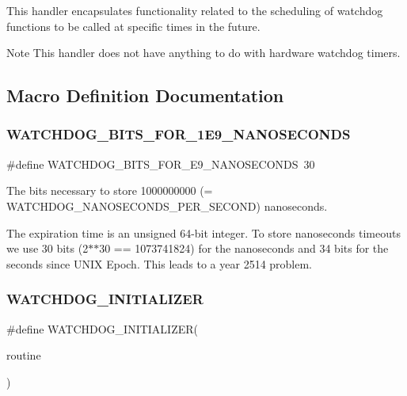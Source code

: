 This handler encapsulates functionality related to the scheduling of watchdog functions to be called at specific times in the future.

\begin{DoxyNote}{Note}
This handler does not have anything to do with hardware watchdog timers. 
\end{DoxyNote}


\subsection{Macro Definition Documentation}
\mbox{\label{group__RTEMSScoreWatchdog_ga117d7412e7bbbda451c962ef1b51829d}} 
\subsubsection{\texorpdfstring{WATCHDOG\_BITS\_FOR\_1E9\_NANOSECONDS}{WATCHDOG\_BITS\_FOR\_1E9\_NANOSECONDS}}
{\footnotesize\ttfamily \#define W\+A\+T\+C\+H\+D\+O\+G\+\_\+\+B\+I\+T\+S\+\_\+\+F\+O\+R\+\_\+E9\+\_\+\+N\+A\+N\+O\+S\+E\+C\+O\+N\+DS~30}



The bits necessary to store 1000000000 (= W\+A\+T\+C\+H\+D\+O\+G\+\_\+\+N\+A\+N\+O\+S\+E\+C\+O\+N\+D\+S\+\_\+\+P\+E\+R\+\_\+\+S\+E\+C\+O\+ND) nanoseconds. 

The expiration time is an unsigned 64-\/bit integer. To store nanoseconds timeouts we use 30 bits (2$\ast$$\ast$30 == 1073741824) for the nanoseconds and 34 bits for the seconds since U\+N\+IX Epoch. This leads to a year 2514 problem. \mbox{\label{group__RTEMSScoreWatchdog_gad9a70c605b99f006aa7f5cbaf84fb05c}} 
\subsubsection{\texorpdfstring{WATCHDOG\_INITIALIZER}{WATCHDOG\_INITIALIZER}}
{\footnotesize\ttfamily \#define W\+A\+T\+C\+H\+D\+O\+G\+\_\+\+I\+N\+I\+T\+I\+A\+L\+I\+Z\+ER(\begin{DoxyParamCaption}\item[{}]{routine }\end{DoxyParamCaption})}

